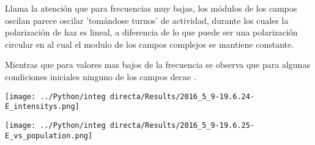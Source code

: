 	Llama la atención que para frecuencias muy bajas, los módulos de los campos oscilan parece oscilar 'tomándose turnos' de actividad, durante los cuales la polarización de haz es lineal, a diferencia de lo que puede ser una polarización circular en al cual el modulo de los campos complejos se mantiene constante.
	
	
	Mientras que para valores mas bajos de la frecuencia se observa que para algunas condiciones iniciales ninguno de los campos decae .
	
	\begin{minipage}{0.5\textwidth}
		
		\centering
		\texttt{[image: ../Python/integ directa/Results/2016\_5\_9-19.6.24-E\_intensitys.png]}
		
	\end{minipage}
	\begin{minipage}{0.5\textwidth}
		
		\centering
		\texttt{[image: ../Python/integ directa/Results/2016\_5\_9-19.6.25-E\_vs\_population.png]}
		
	\end{minipage}
	
	
	
	
	


	
